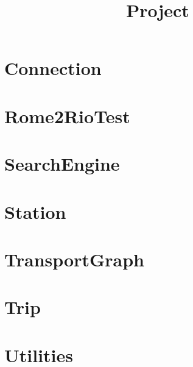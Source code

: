 \documentclass{article}
\begin{document}
\title{Project}
\author{}
\maketitle
\tableofcontents

\section{Connection}

\section{Rome2RioTest}

\section{SearchEngine}

\section{Station}

\section{TransportGraph}

\section{Trip}

\section{Utilities}

\end{document}
